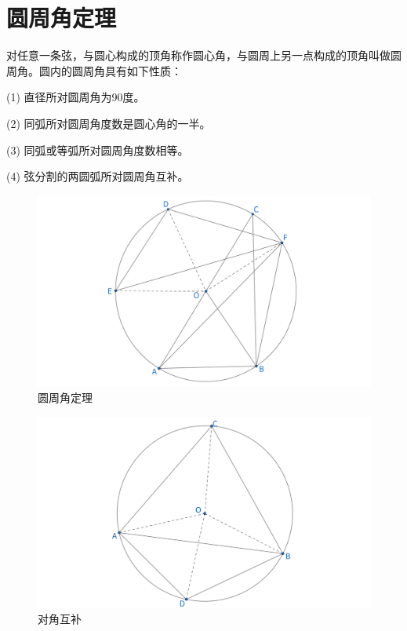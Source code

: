 \section{圆周角定理}
\begin{theorem}[圆周角定理]
    对任意一条弦，与圆心构成的顶角称作圆心角，与圆周上另一点构成的顶角叫做圆周角。圆内的圆周角具有如下性质：
    
    (1) 直径所对圆周角为90度。
    
    (2) 同弧所对圆周角度数是圆心角的一半。
    
    (3) 同弧或等弧所对圆周角度数相等。

    (4) 弦分割的两圆弧所对圆周角互补。
\end{theorem}
\begin{figure}[H]
    \centering
    \includegraphics[width=0.8\linewidth]{figures/圆周角定理.png}
    \caption{圆周角定理}
\end{figure}
\begin{figure}[H]
    \centering
    \includegraphics[width=0.8\linewidth]{figures/圆周角定理-对角互补.png}
    \caption{对角互补}
\end{figure}



